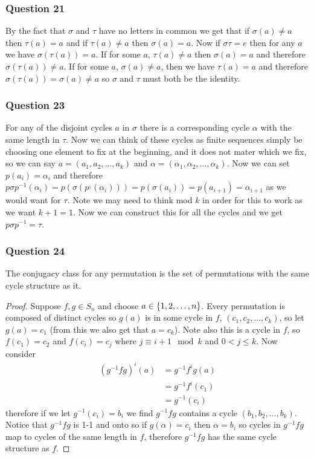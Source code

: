 \documentclass{article}
\begin{document}
\subsubsection{Question 21}
By the fact that $\sigma$ and $\tau$ have no letters in common we get that if $\sigma(a) \not= a$ then $\tau(a) = a$ and if $\tau(a) \not = a$ then $\sigma(a) = a$. Now if $\sigma\tau = e$ then for any $a$ we have $\sigma(\tau(a)) = a$. If for some $a$, $\tau(a)\not = a$ then $\sigma(a) =a$ and therefore $\sigma(\tau(a))\not = a$. If for some $a$, $\sigma(a)\not=a$, then we have $\tau(a) = a$ and therefore $\sigma(\tau(a)) = \sigma(a)\not= a$ so $\sigma$ and $\tau$ must both be the identity.

\subsubsection{Question 23}
For any of the disjoint cycles $a$ in $\sigma$ there is a corresponding cycle $\alpha$ with the same length in $\tau$. Now we can think of these cycles as finite sequences simply be choosing one element to fix at the beginning, and it does not mater which we fix, so we can say $a=(a_1,a_2,\ldots,a_k)$ and $\alpha = (\alpha_1,\alpha_2,\ldots,\alpha_k)$. Now we can set $p(a_i) = \alpha_i$ and therefore $p\sigma p^{-1}(\alpha_i) = p(\sigma(p^{_1}(\alpha_i))) = p(\sigma(a_i)) = p(a_{i+1}) = \alpha_{i+1}$ as we would want for $\tau$. Note we may need to think mod $k$ in order for this to work as we want $k+1 = 1$. Now we can construct this for all the cycles and we get $p\sigma p^{-1} = \tau$.

\subsubsection{Question 24}
\begin{theorem}
The conjugacy class for any permutation is the set of permutations with the same cycle structure as it.
\end{theorem}
\begin{proof}
	Suppose $f,g\in S_n$ and choose $a \in \left\{ {1,2,\ldots,n} \right\}$. Every permutation is composed of distinct cycles so $g(a)$ is in some cycle in $f$,  $(c_1,c_2,\ldots,c_k)$, so let $g(a) = c_1$ (from this we also get that $a = c_k$). Note also this is a cycle in $f$, so $f(c_1) = c_2$ and $f(c_i) = c_{j}$ where $j \equiv i + 1 \mod k$ and $0<j\le k$. Now consider \begin{align*}
	\left(g^{-1}fg\right)^i(a) &= g^{-1}f^ig(a) \\
	&= g^{-1}f^i(c_1) \\
	&= g^{-1}(c_i)
	\end{align*}
	therefore  if we let $g^{-1}(c_i) = b_i$ we find $g^{-1}fg$ contains a cycle $(b_1,b_2,\ldots,b_k)$. Notice that $g^{-1}fg$ is 1-1 and onto so if $g(\alpha) = c_i$ then $\alpha = b_i$ so cycles in $g^{-1}fg$ map to cycles of the same length in $f$, therefore $g^{-1}fg$ has the same cycle structure as $f$.
\end{proof}
\end{document}
